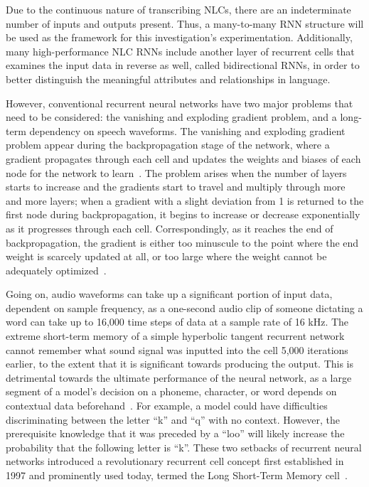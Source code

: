 Due to the continuous nature of transcribing NLCs, there are an indeterminate number of inputs and outputs present.  Thus, a many-to-many RNN structure will be used as the framework for this investigation’s experimentation. Additionally, many high-performance NLC RNNs include another layer of recurrent cells that examines the input data in reverse as well, called bidirectional RNNs, in order to better distinguish the meaningful attributes and relationships in language.
\par
However, conventional recurrent neural networks have two major problems that need to be considered: the vanishing and exploding gradient problem, and a long-term dependency on speech waveforms. The vanishing and exploding gradient problem appear during the backpropagation stage of the network, where a gradient propagates through each cell and updates the weights and biases of each node for the network to learn~\cite{mehrotra_2021}. The problem arises when the number of layers starts to increase and the gradients start to travel and multiply through more and more layers; when a gradient with a slight deviation from 1 is returned to the first node during backpropagation, it begins to increase or decrease exponentially as it progresses through each cell. Correspondingly, as it reaches the end of backpropagation, the gradient is either too minuscule to the point where the end weight is scarcely updated at all, or too large where the weight cannot be adequately optimized~\cite{brownlee_2021,mehrotra_2021}.
\par
Going on, audio waveforms can take up a significant portion of input data, dependent on sample frequency, as a one-second audio clip of someone dictating a word can take up to 16,000 time steps of data at a sample rate of 16 kHz. The extreme short-term memory of a simple hyperbolic tangent recurrent network cannot remember what sound signal was inputted into the cell 5,000 iterations earlier, to the extent that it is significant towards producing the output. This is detrimental towards the ultimate performance of the neural network, as a large segment of a model’s decision on a phoneme, character, or word depends on contextual data beforehand~\cite{koehn_2020}. For example, a model could have difficulties discriminating between the letter “k” and “q” with no context. However, the prerequisite knowledge that it was preceded by a “loo” will likely increase the probability that the following letter is “k”. These two setbacks of recurrent neural networks introduced a revolutionary recurrent cell concept first established in 1997 and prominently used today, termed the Long Short-Term Memory cell~\cite{brownlee_2021}.


